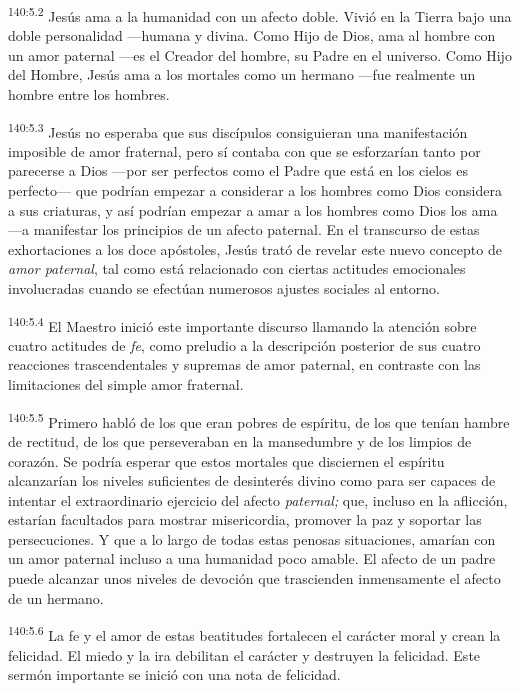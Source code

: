 \par
\textsuperscript{140:5.2} Jesús ama a la humanidad con un afecto doble. Vivió en la Tierra bajo una doble personalidad ---humana y divina. Como Hijo de Dios, ama al hombre con un amor paternal ---es el Creador del hombre, su Padre en el universo. Como Hijo del Hombre, Jesús ama a los mortales como un hermano ---fue realmente un hombre entre los hombres.

\par
\textsuperscript{140:5.3} Jesús no esperaba que sus discípulos consiguieran una manifestación imposible de amor fraternal, pero sí contaba con que se esforzarían tanto por parecerse a Dios ---por ser perfectos como el Padre que está en los cielos es perfecto--- que podrían empezar a considerar a los hombres como Dios considera a sus criaturas, y así podrían empezar a amar a los hombres como Dios los ama ---a manifestar los principios de un afecto paternal. En el transcurso de estas exhortaciones a los doce apóstoles, Jesús trató de revelar este nuevo concepto de \textit{amor paternal}, tal como está relacionado con ciertas actitudes emocionales involucradas cuando se efectúan numerosos ajustes sociales al entorno.

\par
\textsuperscript{140:5.4} El Maestro inició este importante discurso llamando la atención sobre cuatro actitudes de \textit{fe}, como preludio a la descripción posterior de sus cuatro reacciones trascendentales y supremas de amor paternal, en contraste con las limitaciones del simple amor fraternal.

\par
\textsuperscript{140:5.5} Primero habló de los que eran pobres de espíritu, de los que tenían hambre de rectitud, de los que perseveraban en la mansedumbre y de los limpios de corazón. Se podría esperar que estos mortales que disciernen el espíritu alcanzarían los niveles suficientes de desinterés divino como para ser capaces de intentar el extraordinario ejercicio del afecto \textit{paternal;} que, incluso en la aflicción, estarían facultados para mostrar misericordia, promover la paz y soportar las persecuciones. Y que a lo largo de todas estas penosas situaciones, amarían con un amor paternal incluso a una humanidad poco amable. El afecto de un padre puede alcanzar unos niveles de devoción que trascienden inmensamente el afecto de un hermano.

\par
\textsuperscript{140:5.6} La fe y el amor de estas beatitudes fortalecen el carácter moral y crean la felicidad. El miedo y la ira debilitan el carácter y destruyen la felicidad. Este sermón importante se inició con una nota de felicidad.

